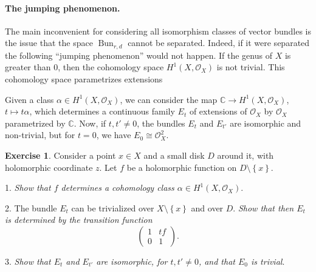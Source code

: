 \documentclass[12pt,a4paper]{amsbook}
\theoremstyle{remark} \newtheorem{rmk}[thm]{Remark}
\theoremstyle{definition} \newtheorem{defn}[thm]{Definition}
\theoremstyle{definition} \newtheorem{ex}[thm]{Example}
\theoremstyle{definition} \newtheorem{ej}{Exercise}
\newcommand{\C}{\mathbb C}
\newcommand{\sO}{\mathscr O}
\DeclareMathOperator{\Bun}{Bun}
\begin{document}
\paragraph{The jumping phenomenon.} The main inconvenient for considering all isomorphism classes of vector bundles is the issue that the space $\Bun_{r,d}$ cannot be separated. Indeed, if it were separated the following ``jumping phenomenon'' would not happen. If the genus of $X$ is greater than $0$, then the cohomology space $H^1(X,\sO_X)$ is not trivial. This cohomology space parametrizes extensions
\begin{center}
\end{center}
Given a class $\alpha \in H^1(X,\sO_X)$, we can consider the map $\C \rightarrow H^1(X,\sO_X)$, $t\mapsto t\alpha$, which determines a continuous family $E_t$ of extensions of $\sO_X$ by $\sO_X$ parametrized by $\C$. Now, if $t,t' \neq 0$, the bundles $E_t$ and $E_{t'}$ are isomorphic and non-trivial, but for $t=0$, we have $E_0 \cong \sO_X^2$.

\begin{ej}
  Consider a point $x\in X$  and a small disk $D$ around it, with holomorphic coordinate $z$. Let $f$ be a holomorphic function on $D\setminus \left\{ x \right\}$.

  1. \textit{Show that $f$ determines a cohomology class $\alpha \in H^1(X,\sO_X)$}.

  2. The bundle $E_t$ can be trivialized over $X\setminus \left\{ x \right\}$ and over $D$. \textit{Show that then $E_t$ is determined by the transition function}
  \begin{equation*}
\begin{pmatrix}
  1 & tf \\
  0 & 1
\end{pmatrix}.
  \end{equation*}

  3. \textit{Show that $E_t$ and $E_{t'}$ are isomorphic, for $t,t'\neq 0$, and that $E_0$ is trivial}.

\end{ej}
\end{document}

